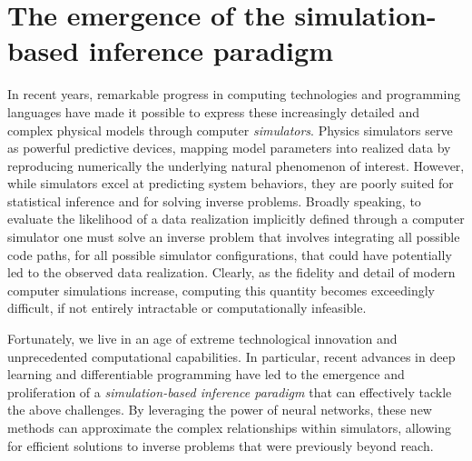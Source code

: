 \section{The emergence of the simulation-based inference paradigm}
In recent years, remarkable progress in computing technologies and programming languages have made it possible to express these increasingly detailed and complex physical models through computer \emph{simulators}. Physics simulators serve as powerful predictive devices, mapping model parameters into realized data by reproducing numerically the underlying natural phenomenon of interest. However, while simulators excel at predicting system behaviors, they are poorly suited for statistical inference and for solving inverse problems. 
Broadly speaking, to evaluate the likelihood of a data realization implicitly defined through a computer simulator one must solve an inverse problem that involves integrating all possible code paths, for all possible simulator configurations, that could have potentially led to the observed data realization. Clearly, as the fidelity and detail of modern computer simulations increase, computing this quantity becomes exceedingly difficult, if not entirely intractable or computationally infeasible. 

Fortunately, we live in an age of extreme technological innovation and unprecedented computational capabilities. In particular, recent advances in  deep learning and differentiable programming have led to the emergence and proliferation of a \emph{simulation-based inference paradigm} that can effectively tackle the above challenges. By leveraging the power of neural networks, these new methods can approximate the complex relationships within simulators, allowing for efficient solutions to inverse problems that were previously beyond reach.

